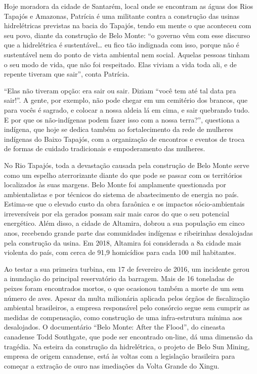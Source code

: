 Hoje moradora da cidade de Santarém, local onde se encontram as águas
dos Rios Tapajós e Amazonas, Patrícia é uma militante contra a
construção das usinas hidrelétricas previstas na bacia do Tapajós, tendo
em mente o que aconteceu com seu povo, diante da construção de Belo
Monte: ``o governo vêm com esse discurso que a hidrelétrica é
sustentável\ldots{} eu fico tão indignada com isso, porque não é
sustentável nem do ponto de vista ambiental nem social. Aquelas pessoas
tinham o seu modo de vida, que não foi respeitado. Elas viviam a vida
toda ali, e de repente tiveram que sair'', conta Patrícia.

``Elas não tiveram opção: era sair ou sair. Diziam ``você tem até tal
data pra sair!''. A gente, por exemplo, não pode chegar em um cemitério
dos brancos, que para vocês é sagrado, e colocar a nossa aldeia lá em
cima, e sair quebrando tudo. E por que os não-indígenas podem fazer isso
com a nossa terra?'', questiona a indígena, que hoje se dedica também ao
fortalecimento da rede de mulheres indígenas do Baixo Tapajós, com a
organização de encontros e eventos de troca de formas de cuidado
tradicionais e empoderamento das mulheres.

No Rio Tapajós, toda a devastação causada pela construção de Belo Monte
serve como um espelho aterrorizante diante do que pode se passar com os
territórios localizados às suas margens. Belo Monte foi amplamente
questionada por ambientalistas e por técnicos do sistema de
abastecimento de energia no país. Estima-se que o elevado custo da obra
faraônica e os impactos sócio-ambientais irreversíveis por ela gerados
possam sair mais caros do que o seu potencial energético. Além disso, a
cidade de Altamira, dobrou a sua população em cinco anos, recebendo
grande parte das comunidades indígenas e ribeirinhas desalojadas pela
construção da usina. Em 2018, Altamira foi considerada a 8a cidade mais
violenta do país, com cerca de 91,9 homicídios para cada 100 mil
habitantes.

Ao testar a sua primeira turbina, em 17 de fevereiro de 2016, um
incidente gerou a inundação do principal reservatório da barragem. Mais
de 16 toneladas de peixes foram encontrados mortos, o que ocasionou
também a morte de um sem número de aves. Apesar da multa milionária
aplicada pelos órgãos de fiscalização ambiental brasileiros, a empresa
responsável pelo consórcio segue sem cumprir as medidas de compensação,
como construção de uma infra-estrutura mínima aos desalojados. O
documentário ``Belo Monte: After the Flood'', do cineasta canadense Todd
Southgate, que pode ser encontrado on-line, dá uma dimensão da tragédia.
Na esteira da construção da hidrelétrica, o projeto de Belo Sun Mining,
empresa de origem canadense, está às voltas com a legislação brasileira
para começar a extração de ouro nas imediações da Volta Grande do Xingu.

